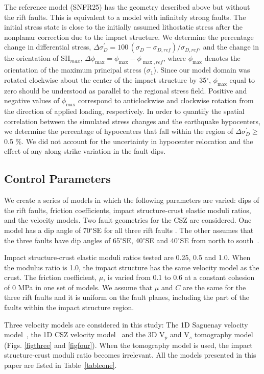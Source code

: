 \documentclass[draft]{agujournal2018}
\begin{document}
The reference model (SNFR25) has the geometry described above but without the rift faults. This is equivalent to a model with infinitely strong faults. The initial stress state is close to the initially assumed lithostatic stress after the nonplanar correction due to the impact structure. We determine the percentage change in differential stress, $\Delta\sigma_{D}^{\prime}=100\,( \sigma_{D}-\sigma_{D,ref}) / \sigma_{D,ref}$, and the change in the orientation of SH$_{max}$,  $\Delta\phi_{\max}=\phi_{\max}-\phi_{\max,ref}$, where $\phi_{\max}$ denotes the orientation of the maximum principal stress ($\sigma_1$). Since our model domain was rotated clockwise about the center of the impact structure by 35$^\circ$, $\phi_{\max}$ equal to zero should be understood as parallel to the regional stress field. Positive and negative values of $\phi_{\max}$ correspond to anticlockwise and clockwise rotation from the direction of applied loading, respectively. In order to quantify the spatial correlation between the simulated stress changes and the earthquake hypocenters, we determine the percentage of hypocenters that fall within the region of $\Delta\sigma_{D}^{\prime} \ge$ 0.5 \%. We did not account for the uncertainty in hypocenter relocation and the effect of any along-strike variation in the fault dips.

\subsection{Control Parameters}
We create a series of models in which the following parameters are varied: dips of the rift faults, friction coefficients, impact structure-crust elastic moduli ratios, and the velocity models. Two fault geometries for the CSZ are considered. One model has a dip angle of 70$^\circ$SE for all three rift faults \citep{Baird_2010}. The other assumes that the three faults have dip angles of 65$^\circ$SE, 40$^\circ$SE and 40$^\circ$SE from north to south~\citep{Powell_2017}.

Impact structure-crust elastic moduli ratios tested are 0.25, 0.5 and 1.0. When the modulus ratio is 1.0, the impact structure has the same velocity model as the crust. The friction coefficient, $\mu$, is varied from 0.1 to 0.6 at a constant cohesion of 0 MPa in one set of models. We assume that $\mu$ and $C$ are the same for the three rift faults and it is uniform on the fault planes, including the part of the faults within the impact structure region.

Three velocity models are considered in this study: The 1D Saguenay velocity model~\citep{Somerville1990}, the 1D CSZ velocity model~\citep{lamontagne1999} and the 3D V$_p$ and V$_s$ tomography model~\citep{Powell_2017} (Figs. \ref{figthree} and \ref{figfour}). When the tomography model is used, the impact structure-crust moduli ratio becomes irrelevant. All the models presented in this paper are listed in Table~\ref{tableone}.
\end{document}
